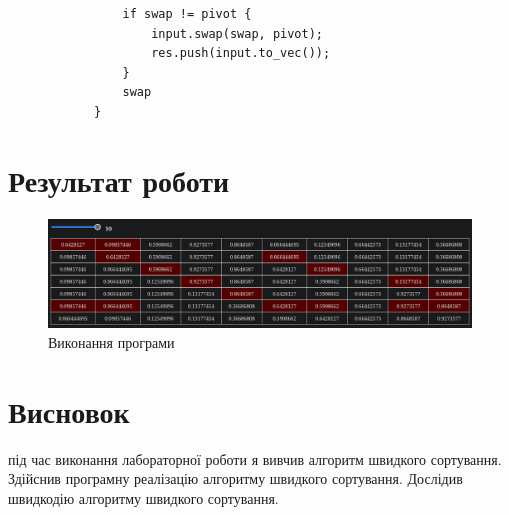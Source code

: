 \documentclass{article}
\begin{document}
\begin{normalsize}
\begin{lstlisting}
				if swap != pivot {
					input.swap(swap, pivot);
					res.push(input.to_vec());
				}
				swap
			}
\end{lstlisting}
		
		\section*{Результат роботи}
		\begin{figure}[H]
			\centering
			\includegraphics[scale=0.36]{1}
			\caption{Виконання програми}
		\end{figure}
		
		\section*{Висновок}
		під час виконання лабораторної роботи я вивчив алгоритм швидкого сортування. Здійснив програмну реалізацію алгоритму швидкого сортування. Дослідив швидкодію алгоритму швидкого сортування.
		
	\end{normalsize}
\end{document}
